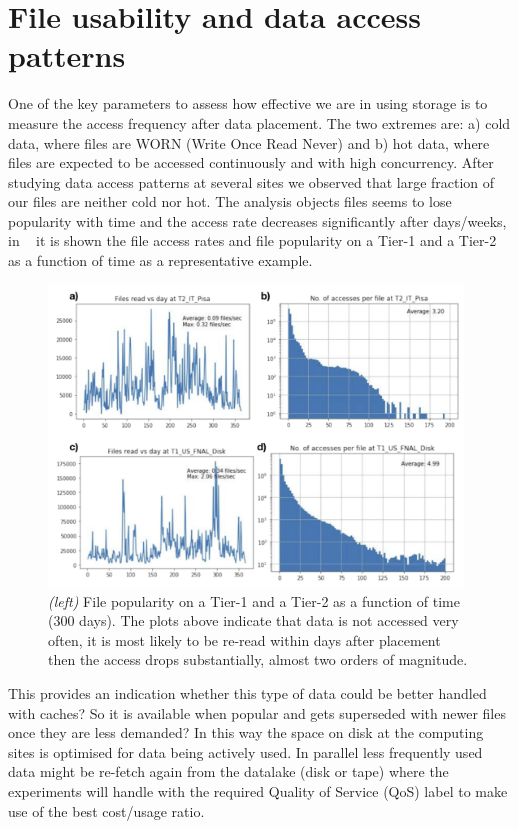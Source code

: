 \section{File usability and data access patterns}
One of the key parameters to assess how effective we are in using storage is to measure the access frequency after data placement. The two extremes are: a) cold data, where files are WORN (Write Once Read Never) and b) hot data, where files are expected to be accessed continuously and with high concurrency.
After studying data access patterns at several sites we observed that large fraction of our files are neither cold nor hot. The analysis objects files seems to lose popularity with time and the access rate decreases significantly after days/weeks, in ~ it is shown the file access rates and file popularity on a Tier-1 and a Tier-2 as a function of time as a representative example.

\begin{figure}[h]
  \centering
  \includegraphics[height=8cm]{dataaccess-chep2019.png}
  \caption{{\em (left)} File popularity on a Tier-1 and a Tier-2 as a function of time (300 days). The plots above indicate that data is not accessed very often, it is most likely to be re-read within days after placement then the access drops substantially, almost two orders of magnitude.}
  \label{fig:access}
\end{figure}

This provides an indication whether this type of data could be better handled with caches? So it is available when popular and gets superseded with newer files once they are less demanded? In this way the space on disk at the computing sites is optimised for data being actively used. In parallel less frequently used data might be re-fetch again from the datalake (disk or tape) where the experiments will handle with the required Quality of Service (QoS) label to make use of the best cost/usage ratio.\\

